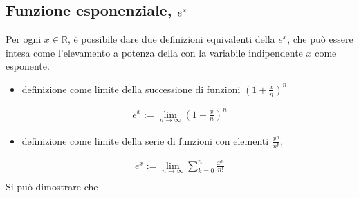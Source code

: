 \documentclass[letterpaper,10pt,italian]{jupyterBook}
\begin{document}
\subsection{Funzione esponenziale, \protect\(e^x\protect\)}
\label{\detokenize{ch/exponential_logarithm:funzione-esponenziale-e-x}}
\sphinxAtStartPar
{} Per ogni \(x \in \mathbb{R}\), è possibile dare due definizioni equivalenti della \(e^x\), che può essere intesa come l’elevamento a potenza della {\hyperref[\detokenize{ch/series:math-hs-series-e-euler}]{}} con la variabile indipendente \(x\) come esponente.
\begin{itemize}
\item {} 
\sphinxAtStartPar
definizione come limite della successione di funzioni \(\left( 1 + \frac{x}{n} \right)^n\)

\end{itemize}
\begin{equation*}
\begin{split}
  e^x := \lim_{n \rightarrow \infty} \left( 1 + \frac{x}{n}\right)^n
\end{split}
\end{equation*}\begin{itemize}
\item {} 
\sphinxAtStartPar
definizione come limite della serie di funzioni con elementi \(\frac{x^n}{n!}\),

\end{itemize}
\begin{equation*}
\begin{split}
  e^x := \lim_{n \rightarrow \infty} \sum_{k=0}^{n} \frac{x^n}{n!} \\
\end{split}
\end{equation*}
\sphinxAtStartPar
Si può dimostrare che
\end{document}
